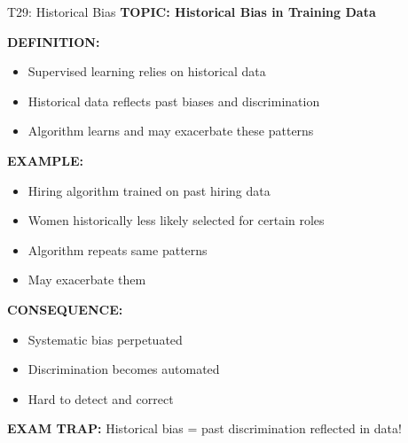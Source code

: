 \documentclass[8pt]{beamer}
\begin{document}
	\begin{frame}{T29: Historical Bias}
		\fontsize{6.5}{7.5}\selectfont
		\textbf{TOPIC: Historical Bias in Training Data}
		
		\vspace{0.1cm}
		\textbf{DEFINITION:}
		\begin{itemize}
			\item Supervised learning relies on historical data
			\item Historical data reflects past biases and discrimination
			\item Algorithm learns and may exacerbate these patterns
		\end{itemize}
		
		\vspace{0.1cm}
		\textbf{EXAMPLE:}
		\begin{itemize}
			\item Hiring algorithm trained on past hiring data
			\item Women historically less likely selected for certain roles
			\item Algorithm repeats same patterns
			\item May exacerbate them
		\end{itemize}
		
		\vspace{0.1cm}
		\textbf{CONSEQUENCE:}
		\begin{itemize}
			\item Systematic bias perpetuated
			\item Discrimination becomes automated
			\item Hard to detect and correct
		\end{itemize}
		
		\textcolor{myred}{\textbf{EXAM TRAP:}} Historical bias = \textcolor{myblue}{past discrimination reflected in data}!
	\end{frame}
	
\end{document}
